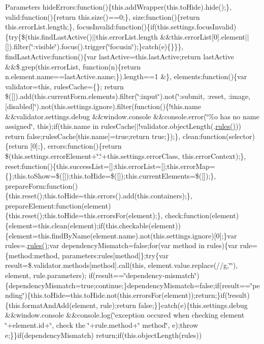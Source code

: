 \begin{DoxyParams}{Parameters}
hide\+Errors\+:function()\{this.\+add\+Wrapper(this.\+to\+Hide).hide();\}, valid\+:function()\{return this.\+size()==0;\}, size\+:function()\{return this.\+error\+List.\+length;\}, focus\+Invalid\+:function()\{if(this.\+settings.\+focus\+Invalid)\{try\{\$(this.\+find\+Last\+Active()$\vert$$\vert$this.error\+List.\+length \&\&this.\+error\+List\mbox{[}0\mbox{]}.element$\vert$$\vert$\mbox{[}\mbox{]}).filter(\char`\"{}\+:visible\char`\"{}).focus().trigger(\char`\"{}focusin\char`\"{});\}catch(e)\{\}\}\}, find\+Last\+Active\+:function()\{var last\+Active=this.\+last\+Active;return last\+Active \&\&\$.grep(this.\+error\+List, function(n)\{return n.\+element.\+name==last\+Active.\+name;\}).length==1 \&\}, elements\+:function()\{var validator=this, rules\+Cache=\{\}; return \$(\mbox{[}\mbox{]}).add(this.\+current\+Form.\+elements).filter(\char`\"{}\+:input\char`\"{}).not(\char`\"{}\+:submit, \+:reset, \+:image, \mbox{[}disabled\mbox{]}\char`\"{}).not(this.\+settings.\+ignore).filter(function()\{!this.name \&\&validator.\+settings.\+debug \&\&window.\+console \&\&console.\+error(\char`\"{}\%o has no name assigned\char`\"{}, this);if(this.\+name in rules\+Cache$\vert$$\vert$!validator.object\+Length(.\hyperlink{obj_2_release_2_package_2_package_tmp_2_scripts_2respond_8js_ada87c2e257bc5ff6e77cdbc23ed986a3}{rules()})) return false;rules\+Cache\mbox{[}this.\+name\mbox{]}=true;return true;\});\}, clean\+:function(selector)\{return \mbox{[}0\mbox{]};\}, errors\+:function()\{return \$(this.\+settings.\+error\+Element+\char`\"{}.\char`\"{}+this.settings.\+error\+Class, this.\+error\+Context);\}, reset\+:function()\{this.\+success\+List=\mbox{[}\mbox{]};this.\+error\+List=\mbox{[}\mbox{]};this.\+error\+Map=\{\};this.\+to\+Show=\$(\mbox{[}\mbox{]});this.\+to\+Hide=\$(\mbox{[}\mbox{]});this.\+current\+Elements=\$(\mbox{[}\mbox{]});\}, prepare\+Form\+:function()\{this.\+reset();this.\+to\+Hide=this.\+errors().add(this.\+containers);\}, prepare\+Element\+:function(element)\{this.\+reset();this.\+to\+Hide=this.\+errors\+For(element);\}, check\+:function(element)\{element=this.\+clean(element);if(this.\+checkable(element))\{element=this.\+find\+By\+Name(element.\+name).not(this.\+settings.\+ignore)\mbox{[}0\mbox{]};\}var rules=.\hyperlink{obj_2_release_2_package_2_package_tmp_2_scripts_2respond_8js_ada87c2e257bc5ff6e77cdbc23ed986a3}{rules()};var dependency\+Mismatch=false;for(var method in rules)\{var rule=\{method\+:method, parameters\+:rules\mbox{[}method\mbox{]}\};try\{var result=\$.validator.\+methods\mbox{[}method\mbox{]}.call(this, element.\+value.\+replace(//g,\char`\"{}\char`\"{}), element, rule.\+parameters); if(result==\char`\"{}dependency-\/mismatch\char`\"{})\{dependency\+Mismatch=true;continue;\}dependency\+Mismatch=false;if(result==\char`\"{}pending\char`\"{})\{this.\+to\+Hide=this.\+to\+Hide.\+not(this.\+errors\+For(element));return;\}if(!result)\{this.\+format\+And\+Add(element, rule);return false;\}\}catch(e)\{this.\+settings.\+debug \&\&window.\+console \&\&console.\+log(\char`\"{}exception occured when checking element \char`\"{}+element.id+\char`\"{}, check the \textquotesingle{}\char`\"{}+rule.method+\char`\"{}\textquotesingle{} method\char`\"{}, e);throw e;\}\}if(dependency\+Mismatch) return;if(this.\+object\+Length(rules)) 
\end{DoxyParams}
